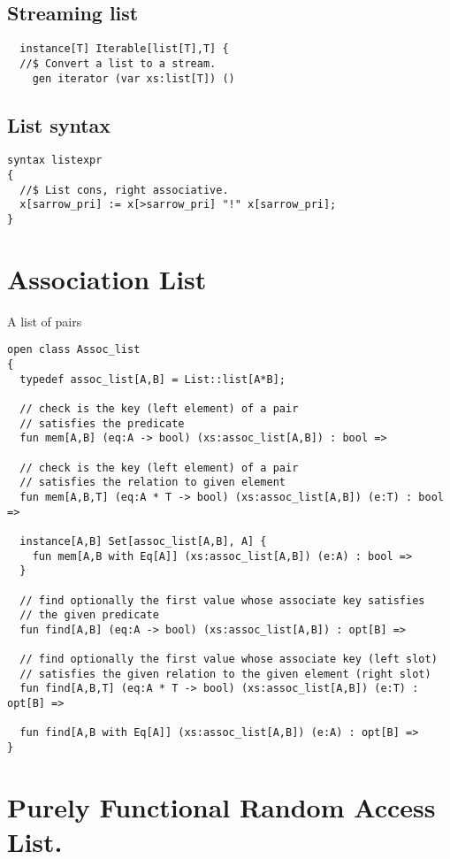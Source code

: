 \documentclass[oneside]{book}
\begin{document}
\subsection{Streaming list}
\begin{verbatim}
  instance[T] Iterable[list[T],T] {
  //$ Convert a list to a stream.
    gen iterator (var xs:list[T]) ()
\end{verbatim}

\subsection{List syntax}

\begin{verbatim}
syntax listexpr
{
  //$ List cons, right associative.
  x[sarrow_pri] := x[>sarrow_pri] "!" x[sarrow_pri]; 
}
\end{verbatim}

\section{Association List}
A list of pairs

\begin{verbatim}
open class Assoc_list
{
  typedef assoc_list[A,B] = List::list[A*B];

  // check is the key (left element) of a pair
  // satisfies the predicate
  fun mem[A,B] (eq:A -> bool) (xs:assoc_list[A,B]) : bool =>

  // check is the key (left element) of a pair
  // satisfies the relation to given element 
  fun mem[A,B,T] (eq:A * T -> bool) (xs:assoc_list[A,B]) (e:T) : bool =>

  instance[A,B] Set[assoc_list[A,B], A] {
    fun mem[A,B with Eq[A]] (xs:assoc_list[A,B]) (e:A) : bool => 
  }

  // find optionally the first value whose associate key satisfies 
  // the given predicate
  fun find[A,B] (eq:A -> bool) (xs:assoc_list[A,B]) : opt[B] =>

  // find optionally the first value whose associate key (left slot)
  // satisfies the given relation to the given element (right slot) 
  fun find[A,B,T] (eq:A * T -> bool) (xs:assoc_list[A,B]) (e:T) : opt[B] =>

  fun find[A,B with Eq[A]] (xs:assoc_list[A,B]) (e:A) : opt[B] =>
}
\end{verbatim}

\section{Purely Functional Random Access List.}
\end{document}
